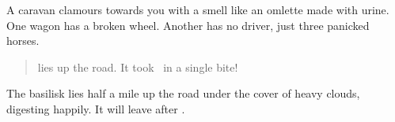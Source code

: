\begin{boxtext}
  A caravan clamours towards you with a smell like an omlette made with urine.
  One wagon has a broken wheel.  Another has no driver, just three panicked
  horses.

  \begin{quotation}
	 lies up the road.  It took \composeHumanName\ in a single
	bite!
  \end{quotation}
\end{boxtext}

The \gls{basilisk} lies half a mile up the road under the cover of heavy
clouds, digesting happily.  It will leave after .

\basilisk
